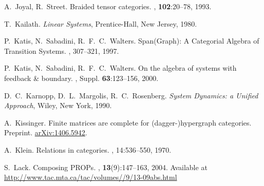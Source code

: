 \begin{thebibliography}{RSW00}
    A.\ Joyal, R.\ Street.
    \newblock Braided tensor categories.
    , {\bf 102}:20--78, 1993.

    T.\ Kailath.
    \newblock \emph{Linear Systems}, Prentice-Hall, New Jersey, 1980.

    P.\ Katis, N.\ Sabadini, R.\ F.\ C.\ Walters.
    \newblock Span(Graph): A Categorial Algebra of Transition Systems.
    , 307--321, 1997. 

    P.\ Katis, N.\ Sabadini, R.\ F.\ C.\ Walters.
    \newblock On the algebra of systems with feedback \& boundary.
    ,
    Suppl. {\bf 63}:123--156, 2000.



    D.\ C.\ Karnopp, D.\ L.\ Margolis, R.\ C.\ Rosenberg.
    \newblock \textsl{System Dynamics: a Unified Approach}, Wiley, New York, 1990.

    A.\ Kissinger.
    \newblock Finite matrices are complete for (dagger-)hypergraph categories.
    \newblock Preprint.
    \newblock \href{http://arxiv.org/abs/1406.5942}{arXiv:1406.5942}.

    A.\ Klein. 
    \newblock Relations in categories. 
    , 14:536--550, 1970.

    S.\ Lack.
    \newblock Composing PROPs.
    , {\bf 13}(9):147--163,
    2004.
    \newblock Available at
    \href{http://www.tac.mta.ca/tac/volumes/13/9/13-09abs.html}{http://www.tac.mta.ca/tac/volumes//9/13-09abs.html}


\end{thebibliography}
